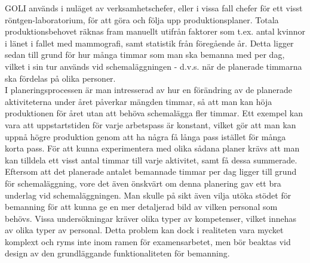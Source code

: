 GOLI används i nuläget av verksamhetschefer, eller i vissa fall chefer
för ett visst röntgen-laboratorium, för att göra och följa upp
produktionsplaner. Totala produktionsbehovet räknas fram manuellt
utifrån faktorer som t.ex. antal kvinnor i länet i fallet med
mammografi, samt statistik från föregående år. Detta ligger sedan till
grund för hur många timmar som man ska bemanna med per dag, vilket i sin
tur används vid schemaläggningen - d.v.s. när de planerade timmarna ska
fördelas på olika personer.\\

I planeringsprocessen är man intresserad av hur en förändring av de
planerade aktiviteterna under året påverkar mängden timmar, så att man
kan höja produktionen för året utan att behöva schemalägga fler timmar.
Ett exempel kan vara att uppstartstiden för varje arbetspass är
konstant, vilket gör att man kan uppnå högre produktion genom att ha
några få långa pass istället för många korta pass. För att kunna
experimentera med olika sådana planer krävs att man kan tilldela ett
visst antal timmar till varje aktivitet, samt få dessa summerade.\\

Eftersom att det planerade antalet bemannade timmar per dag ligger till
grund för schemaläggning, vore det även önskvärt om denna planering gav
ett bra underlag vid schemaläggningen. Man skulle på sikt även vilja
utöka stödet för bemanning för att kunna ge en mer detaljerad bild av
vilken personal som behövs. Vissa undersökningar kräver olika typer av
kompetenser, vilket innehas av olika typer av personal. Detta problem
kan dock i realiteten vara mycket komplext och ryms inte inom
ramen för examensarbetet, men bör beaktas vid design av den
grundläggande funktionaliteten för bemanning.\\
